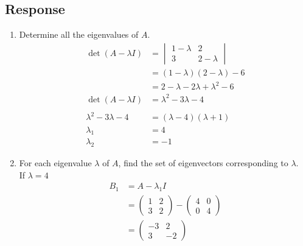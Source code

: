 \documentclass[13pt]{article}
\begin{document}
\begin{enumerate}[label=(\alph*),leftmargin=*]
    \subsection*{Response}
    \begin{enumerate}[label=(\roman*),leftmargin=*]
    \item Determine all the eigenvalues of $A$.
      \begin{align*}
        \det(A - \lambda I) &=
                             \begin{vmatrix}
                               1 - \lambda & 2 \\
                               3 & 2 - \lambda
                             \end{vmatrix} \\
                            &= (1 - \lambda)(2 - \lambda) - 6 \\
                            &= 2 - \lambda - 2\lambda + \lambda^2 - 6 \\
        \det(A - \lambda I) &= \lambda^2 - 3\lambda - 4 \\ \\
        \lambda^2 - 3\lambda - 4 &= (\lambda - 4)(\lambda + 1) \\
        \lambda_1 &= 4 \\
        \lambda_2 &= -1
      \end{align*}
    \item For each eigenvalue $\lambda$ of $A$, find the set of eigenvectors corresponding to $\lambda$. \\
      If $\lambda = 4$ 
      \begin{align*}
        B_1 &= A - \lambda_1 I \\
            &=
              \begin{pmatrix}
                1 & 2 \\
                3 & 2
              \end{pmatrix} -
              \begin{pmatrix}
                4 & 0 \\
                0 & 4
              \end{pmatrix} \\
            &=
              \begin{pmatrix}
                -3 & 2 \\
                3 & -2
              \end{pmatrix} \\
      \end{align*}

\end{enumerate}
\end{enumerate}
\end{document}
